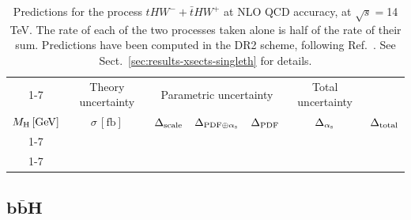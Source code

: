 \begin{table}[ht!]
\caption{\label{tab:thw-tot14} Predictions for the process $tHW^- + \bar t HW^+$ at NLO QCD accuracy, at $\sqrt{s}=$14 TeV. The rate of each of the two processes taken alone is
    half of the rate of their sum. Predictions have been computed in the DR2 scheme, following Ref.~\cite{Demartin:2016axk}. See Sect.~\ref{sec:results-xsects-singleth} for details.}
\centering
\scriptsize
{\renewcommand{\arraystretch}{1.4}
\begin{tabular}{| cc | c | ccc | c |}
\cline{1-7}
\multicolumn{2}{|c|}{\(\sqrt{s} = 14\,\mathrm{TeV}\)} &
\multicolumn{1}{|c|}{Theory uncertainty} &
\multicolumn{3}{|c|}{Parametric uncertainty} &
\multicolumn{1}{c|}{Total uncertainty} \\
\(M_\mathrm{H}\,[\mathrm{GeV}]\) & \(\sigma\,[\mathrm{fb}]\) &
\(\Delta_{\rm scale}\) &
\(\Delta_{{\rm PDF}\oplus\alpha_{\mathrm{s}}}\) &
{\color{black!55}\(\Delta_{\rm PDF}\)} & {\color{black!55}\(\Delta_{\alpha_{\mathrm{s}}}\)} &
\(\Delta_{\rm total}\)
\\
\cline{1-7}
 \\
\cline{1-7}
\end{tabular}
}
\end{table}

\clearpage
\subsection{\texorpdfstring{$\boldsymbol{b\bar{b}H}$}{bbH}}

